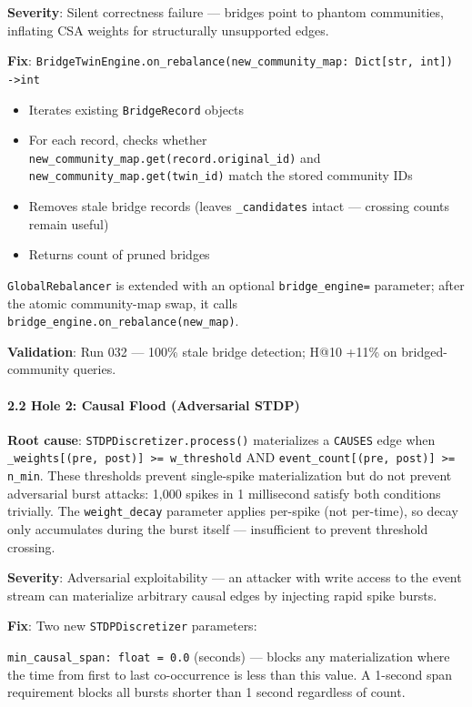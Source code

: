 \documentclass[10pt,journal,compsoc]{IEEEtran}
\begin{document}
\textbf{Severity}: Silent correctness failure — bridges point to phantom communities, inflating CSA weights for struc\-turally unsupported edges.

\textbf{Fix}: \texttt{BridgeTwinEngine.on\_rebalance(new\_community\_map: Dict[str, int]) -\textgreater  int}
\begin{itemize}
\item Iterates existing \texttt{BridgeRecord} objects
\item For each record, checks whether \texttt{new\_community\_map.get(record.original\_id)} and \texttt{new\_community\_map.get(twin\_id)} match the stored community IDs
\item Removes stale bridge records (leaves \texttt{\_candidates} intact — crossing counts remain useful)
\item Returns count of pruned bridges

\end{itemize}
\texttt{GlobalRebalancer} is extended with an optional \texttt{bridge\_engine=} parameter; after the atomic community-map swap, it calls \texttt{bridge\_engine.on\_rebalance(new\_map)}.

\textbf{Validation}: Run 032 — 100\% stale bridge detection; H@10 +11\% on bridged-community queries.

\paragraph{2.2 Hole 2: Causal Flood (Adversarial STDP)}

\textbf{Root cause}: \texttt{STDPDiscretizer.process()} mater\-ializes a \texttt{CAUSES} edge when \texttt{\_weights[(pre, post)] \textgreater = w\_threshold} AND \texttt{event\_count[(pre, post)] \textgreater = n\_min}. These thresholds prevent single-spike mater\-ialization but do not prevent adversarial burst attacks: 1,000 spikes in 1 millisecond satisfy both conditions trivially. The \texttt{weight\_decay} parameter applies per-spike (not per-time), so decay only accumulates during the burst itself — insuf\-ficient to prevent threshold crossing.

\textbf{Severity}: Adversarial explo\-itability — an attacker with write access to the event stream can materialize arbitrary causal edges by injecting rapid spike bursts.

\textbf{Fix}: Two new \texttt{STDPDiscretizer} parameters:

\texttt{min\_causal\_span: float = 0.0} (seconds) — blocks any mater\-ialization where the time from first to last co-occurrence is less than this value. A 1-second span requirement blocks all bursts shorter than 1 second regardless of count.
\end{document}
